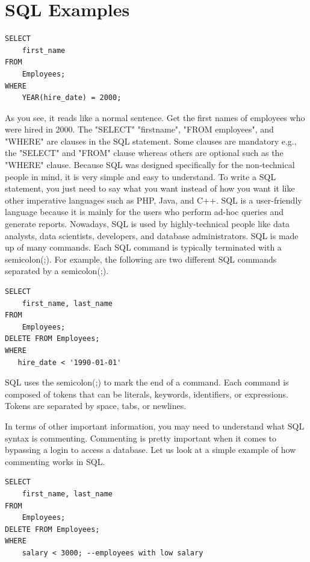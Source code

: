 \section{SQL Examples}
\label{sec:sql examples}


\bigskip
\bigskip
\begin{lstlisting}
SELECT 
    first_name
FROM
    Employees;
WHERE
    YEAR(hire_date) = 2000;
\end{lstlisting}
\bigskip
\bigskip

As you see, it reads like a normal sentence. Get the first names of employees who were hired in 2000.
The "SELECT" "firstname", "FROM employees", and "WHERE" are clauses in the SQL statement. Some clauses are mandatory e.g., the "SELECT" and "FROM" clause whereas others are optional such as the "WHERE" clause.
Because SQL was designed specifically for the non-technical people in mind, it is very simple and easy to understand. To write a SQL statement, you just need to say what you want instead of how you want it like other imperative languages such as PHP, Java, and C++. SQL is a user-friendly language because it is mainly for the users who perform ad-hoc queries and generate reports. Nowadays, SQL is used by highly-technical people like data analysts, data scientists, developers, and database administrators.
SQL is made up of many commands. Each SQL command is typically terminated with a semicolon(;). For example, the following are two different SQL commands separated by a semicolon(;).

\bigskip
\bigskip
\begin{lstlisting}
SELECT 
    first_name, last_name
FROM
    Employees;
DELETE FROM Employees;
WHERE
   hire_date < '1990-01-01'
\end{lstlisting}
\bigskip
\bigskip

SQL uses the semicolon(;) to mark the end of a command. Each command is composed of tokens that can be literals, keywords, identifiers, or expressions. Tokens are separated by space, tabs, or newlines.

In terms of other important information, you may need to understand what SQL syntax is commenting. Commenting is pretty important when it comes to bypassing a login to access a database. Let us look at a simple example of how commenting works in SQL.

\bigskip
\bigskip
\begin{lstlisting}
SELECT 
    first_name, last_name
FROM
    Employees;
DELETE FROM Employees;
WHERE
    salary < 3000; --employees with low salary
\end{lstlisting}
\bigskip
\bigskip


